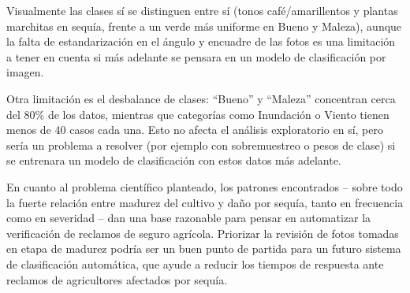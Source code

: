 \documentclass[11pt]{article}
\begin{document}
Visualmente las clases sí se distinguen entre sí (tonos café/amarillentos y plantas marchitas en sequía, frente a un verde más uniforme en Bueno y Maleza), aunque la falta de estandarización en el ángulo y encuadre de las fotos es una limitación a tener en cuenta si más adelante se pensara en un modelo de clasificación por imagen.

Otra limitación es el desbalance de clases: ``Bueno'' y ``Maleza'' concentran cerca del 80\% de los datos, mientras que categorías como Inundación o Viento tienen menos de 40 casos cada una. Esto no afecta el análisis exploratorio en sí, pero sería un problema a resolver (por ejemplo con sobremuestreo o pesos de clase) si se entrenara un modelo de clasificación con estos datos más adelante.

En cuanto al problema científico planteado, los patrones encontrados -- sobre todo la fuerte relación entre madurez del cultivo y daño por sequía, tanto en frecuencia como en severidad -- dan una base razonable para pensar en automatizar la verificación de reclamos de seguro agrícola. Priorizar la revisión de fotos tomadas en etapa de madurez podría ser un buen punto de partida para un futuro sistema de clasificación automática, que ayude a reducir los tiempos de respuesta ante reclamos de agricultores afectados por sequía.
\end{document}
